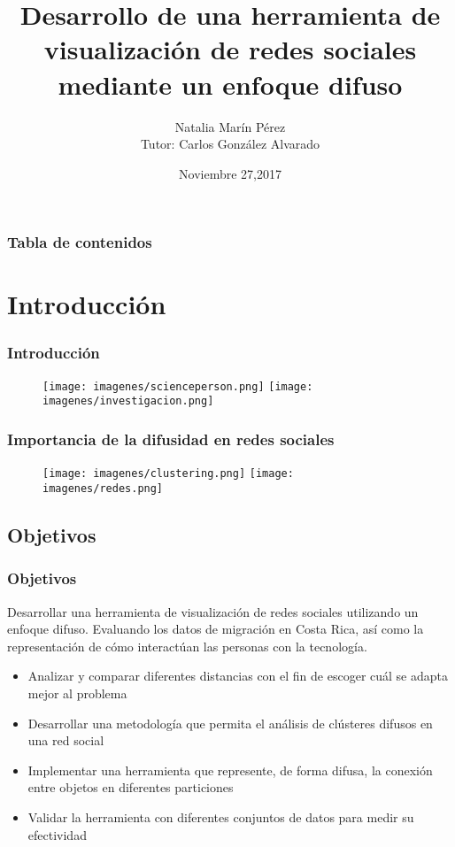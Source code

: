 \documentclass[hyperref={pdfpagelabels=false}]{beamer}
\title{Desarrollo de una herramienta de visualizaci\'on de redes sociales mediante un enfoque difuso}
\author{Natalia Mar\'in P\'erez \\
       Tutor: Carlos Gonz\'alez Alvarado}
\institute{Instituto Tecnol\'ogico de Costa Rica}
\date{Noviembre 27,2017}
\begin{document}
\begin{frame}
\titlepage
\end{frame}


\begin{frame}
\frametitle{Tabla de contenidos}
\tableofcontents
\end{frame} 


\section{Introducci\'on} 
\begin{frame}
\frametitle{Introducci\'on} 
    \begin{figure}
        \begin{center}
            \texttt{[image: imagenes/scienceperson.png]}
            \hfill
            \texttt{[image: imagenes/investigacion.png]}
        \end{center}
    \end{figure}

\end{frame}
\begin{frame}
\frametitle{Importancia de la difusidad en redes sociales} 
    \begin{figure}
        \begin{center}
            \texttt{[image: imagenes/clustering.png]}
            \hfill
            \texttt{[image: imagenes/redes.png]}

        \end{center}
    \end{figure}

\end{frame}
\subsection{Objetivos}
\begin{frame}
\frametitle{Objetivos}
      \begin{tcolorbox}
  Desarrollar una herramienta de visualizaci\'on de redes sociales utilizando un enfoque difuso. Evaluando los datos de migraci\'on en Costa Rica, as\'i como la representaci\'on de c\'omo interact\'uan las
personas con la tecnolog\'ia.
       \end{tcolorbox}

\begin{itemize}
\item   Analizar y comparar diferentes distancias con el fin de escoger cu\'al se adapta mejor al problema
\item Desarrollar una metodolog\'ia que permita el an\'alisis de cl\'usteres difusos en una red social
\item Implementar una herramienta que represente, de forma difusa, la conexi\'on entre objetos en diferentes particiones
\item Validar la herramienta con diferentes conjuntos de datos para medir su efectividad
\end{itemize} 
\end{frame}
\end{document}
